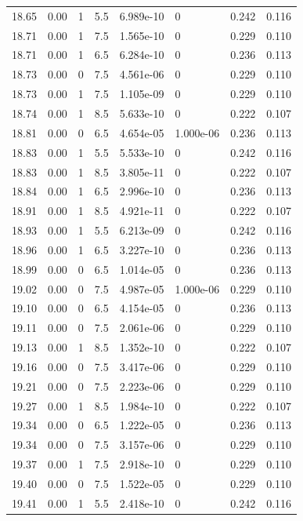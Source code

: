 \documentclass[preview]{standalone}
\begin{document}
{{{{{{{{{{{{{{{{\begin{tabular}{L{1.2cm}C{1.2cm} C{0.3cm}C{0.5cm} C{1.4cm}C{1.4cm} C{1.4cm}C{1.4cm}}
  18.65  &  0.00  & 1     & 5.5 &  6.989e-10  & 0  & 0.242 &  0.116   \\ 
  18.71  &  0.00  & 1     & 7.5 &  1.565e-10  & 0  & 0.229 &  0.110   \\ 
  18.71  &  0.00  & 1     & 6.5 &  6.284e-10  & 0  & 0.236 &  0.113   \\ 
  18.73  &  0.00  & 0     & 7.5 &  4.561e-06  & 0  & 0.229 &  0.110   \\ 
  18.73  &  0.00  & 1     & 7.5 &  1.105e-09  & 0  & 0.229 &  0.110   \\ 
  18.74  &  0.00  & 1     & 8.5 &  5.633e-10  & 0  & 0.222 &  0.107   \\ 
  18.81  &  0.00  & 0     & 6.5 &  4.654e-05  & 1.000e-06  & 0.236 &  0.113   \\ 
  18.83  &  0.00  & 1     & 5.5 &  5.533e-10  & 0  & 0.242 &  0.116   \\ 
  18.83  &  0.00  & 1     & 8.5 &  3.805e-11  & 0  & 0.222 &  0.107   \\ 
  18.84  &  0.00  & 1     & 6.5 &  2.996e-10  & 0  & 0.236 &  0.113   \\ 
  18.91  &  0.00  & 1     & 8.5 &  4.921e-11  & 0  & 0.222 &  0.107   \\ 
  18.93  &  0.00  & 1     & 5.5 &  6.213e-09  & 0  & 0.242 &  0.116   \\ 
  18.96  &  0.00  & 1     & 6.5 &  3.227e-10  & 0  & 0.236 &  0.113   \\ 
  18.99  &  0.00  & 0     & 6.5 &  1.014e-05  & 0  & 0.236 &  0.113   \\ 
  19.02  &  0.00  & 0     & 7.5 &  4.987e-05  & 1.000e-06  & 0.229 &  0.110   \\ 
  19.10  &  0.00  & 0     & 6.5 &  4.154e-05  & 0  & 0.236 &  0.113   \\ 
  19.11  &  0.00  & 0     & 7.5 &  2.061e-06  & 0  & 0.229 &  0.110   \\ 
  19.13  &  0.00  & 1     & 8.5 &  1.352e-10  & 0  & 0.222 &  0.107   \\ 
  19.16  &  0.00  & 0     & 7.5 &  3.417e-06  & 0  & 0.229 &  0.110   \\ 
  19.21  &  0.00  & 0     & 7.5 &  2.223e-06  & 0  & 0.229 &  0.110   \\ 
  19.27  &  0.00  & 1     & 8.5 &  1.984e-10  & 0  & 0.222 &  0.107   \\ 
  19.34  &  0.00  & 0     & 6.5 &  1.222e-05  & 0  & 0.236 &  0.113   \\ 
  19.34  &  0.00  & 0     & 7.5 &  3.157e-06  & 0  & 0.229 &  0.110   \\ 
  19.37  &  0.00  & 1     & 7.5 &  2.918e-10  & 0  & 0.229 &  0.110   \\ 
  19.40  &  0.00  & 0     & 7.5 &  1.522e-05  & 0  & 0.229 &  0.110   \\ 
  19.41  &  0.00  & 1     & 5.5 &  2.418e-10  & 0  & 0.242 &  0.116   \\ 
\hline 
\end{tabular} 

}}}}}}}}}}}}}}}}
\end{document}
